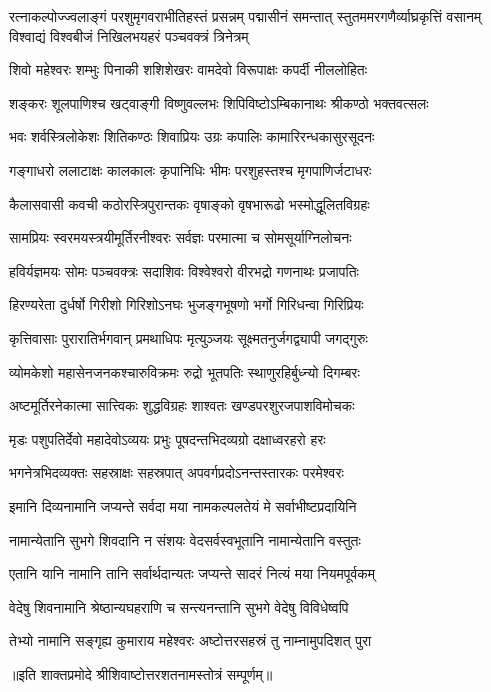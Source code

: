 

{रत्नाकल्पोज्ज्वलाङ्गं परशुमृगवराभीतिहस्तं प्रसन्नम्}
{पद्मासीनं समन्तात् स्तुतममरगणैर्व्याघ्रकृत्तिं वसानम्}
{विश्वाद्यं विश्वबीजं निखिलभयहरं पञ्चवक्त्रं त्रिनेत्रम्}

\twolineshloka
{शिवो महेश्वरः शम्भुः पिनाकी शशिशेखरः}
{वामदेवो विरूपाक्षः कपर्दी नीललोहितः}

\twolineshloka
{शङ्करः शूलपाणिश्च खट्वाङ्गी विष्णुवल्लभः}
{शिपिविष्टोऽम्बिकानाथः श्रीकण्ठो भक्तवत्सलः}

\twolineshloka
{भवः शर्वस्त्रिलोकेशः शितिकण्ठः शिवाप्रियः}
{उग्रः कपालिः कामारिरन्धकासुरसूदनः}

\twolineshloka
{गङ्गाधरो ललाटाक्षः कालकालः कृपानिधिः}
{भीमः परशुहस्तश्च मृगपाणिर्जटाधरः}

\twolineshloka
{कैलासवासी कवची कठोरस्त्रिपुरान्तकः}
{वृषाङ्को वृषभारूढो भस्मोद्धूलितविग्रहः}

\twolineshloka
{सामप्रियः स्वरमयस्त्रयीमूर्तिरनीश्वरः}
{सर्वज्ञः परमात्मा च सोमसूर्याग्निलोचनः}

\twolineshloka
{हविर्यज्ञमयः सोमः पञ्चवक्त्रः सदाशिवः}
{विश्वेश्वरो वीरभद्रो गणनाथः प्रजापतिः}

\twolineshloka
{हिरण्यरेता दुर्धर्षो गिरीशो गिरिशोऽनघः}
{भुजङ्गभूषणो भर्गो गिरिधन्वा गिरिप्रियः}

\twolineshloka
{कृत्तिवासाः पुरारातिर्भगवान् प्रमथाधिपः}
{मृत्युञ्जयः सूक्ष्मतनुर्जगद्व्यापी जगद्गुरुः}

\twolineshloka
{व्योमकेशो महासेनजनकश्चारुविक्रमः}
{रुद्रो भूतपतिः स्थाणुरहिर्बुध्न्यो दिगम्बरः}

\twolineshloka
{अष्टमूर्तिरनेकात्मा सात्त्विकः शुद्धविग्रहः}
{शाश्वतः खण्डपरशुरजपाशविमोचकः}

\twolineshloka
{मृडः पशुपतिर्देवो महादेवोऽव्ययः प्रभुः}
{पूषदन्तभिदव्यग्रो दक्षाध्वरहरो हरः}

\twolineshloka
{भगनेत्रभिदव्यक्तः सहस्राक्षः सहस्रपात्}
{अपवर्गप्रदोऽनन्तस्तारकः परमेश्वरः}

\twolineshloka
{इमानि दिव्यनामानि जप्यन्ते सर्वदा मया}
{नामकल्पलतेयं मे सर्वाभीष्टप्रदायिनि}

\twolineshloka
{नामान्येतानि सुभगे शिवदानि न संशयः}
{वेदसर्वस्वभूतानि नामान्येतानि वस्तुतः}

\twolineshloka
{एतानि यानि नामानि तानि सर्वार्थदान्यतः}
{जप्यन्ते सादरं नित्यं मया नियमपूर्वकम्}

\twolineshloka
{वेदेषु शिवनामानि श्रेष्ठान्यघहराणि च}
{सन्त्यनन्तानि सुभगे वेदेषु विविधेष्वपि}

\twolineshloka
{तेभ्यो नामानि सङ्गृह्य कुमाराय महेश्वरः}
{अष्टोत्तरसहस्रं तु नाम्नामुपदिशत् पुरा}

{॥इति शाक्तप्रमोदे श्रीशिवाष्टोत्तरशतनामस्तोत्रं सम्पूर्णम्॥}